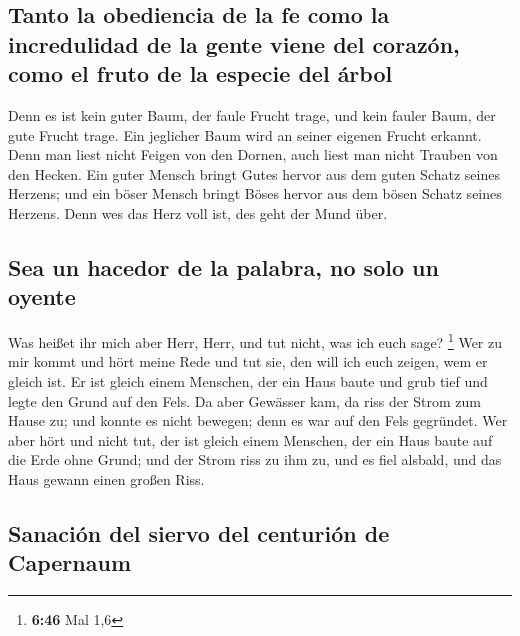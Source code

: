 \hypertarget{tanto-la-obediencia-de-la-fe-como-la-incredulidad-de-la-gente-viene-del-corazuxf3n-como-el-fruto-de-la-especie-del-uxe1rbol}{%
\subsection{Tanto la obediencia de la fe como la incredulidad de la
gente viene del corazón, como el fruto de la especie del
árbol}\label{tanto-la-obediencia-de-la-fe-como-la-incredulidad-de-la-gente-viene-del-corazuxf3n-como-el-fruto-de-la-especie-del-uxe1rbol}}

 Denn es ist kein guter Baum, der faule Frucht trage, und
kein fauler Baum, der gute Frucht trage.  Ein jeglicher
Baum wird an seiner eigenen Frucht erkannt. Denn man liest nicht Feigen
von den Dornen, auch liest man nicht Trauben von den Hecken.
 Ein guter Mensch bringt Gutes hervor aus dem guten
Schatz seines Herzens; und ein böser Mensch bringt Böses hervor aus dem
bösen Schatz seines Herzens. Denn wes das Herz voll ist, des geht der
Mund über.

\hypertarget{sea-un-hacedor-de-la-palabra-no-solo-un-oyente}{%
\subsection{Sea un hacedor de la palabra, no solo un
oyente}\label{sea-un-hacedor-de-la-palabra-no-solo-un-oyente}}

 Was heißet ihr mich aber Herr, Herr, und tut nicht, was
ich euch sage? \footnote{\textbf{6:46} Mal 1,6}  Wer zu
mir kommt und hört meine Rede und tut sie, den will ich euch zeigen, wem
er gleich ist.  Er ist gleich einem Menschen, der ein
Haus baute und grub tief und legte den Grund auf den Fels. Da aber
Gewässer kam, da riss der Strom zum Hause zu; und konnte es nicht
bewegen; denn es war auf den Fels gegründet.  Wer aber
hört und nicht tut, der ist gleich einem Menschen, der ein Haus baute
auf die Erde ohne Grund; und der Strom riss zu ihm zu, und es fiel
alsbald, und das Haus gewann einen großen Riss.

\hypertarget{sanaciuxf3n-del-siervo-del-centuriuxf3n-de-capernaum}{%
\subsection{Sanación del siervo del centurión de
Capernaum}\label{sanaciuxf3n-del-siervo-del-centuriuxf3n-de-capernaum}}

